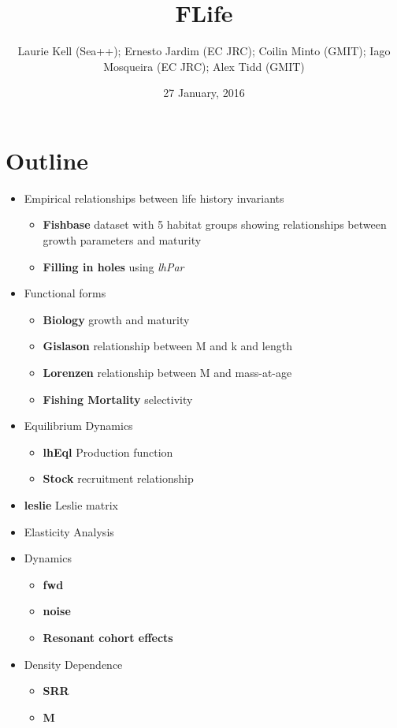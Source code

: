 \documentclass[]{article}
\title{FLife}
\author{Laurie Kell (Sea++); Ernesto Jardim (EC JRC); Coilin Minto (GMIT); Iago Mosqueira (EC JRC); Alex Tidd (GMIT)}
\date{27 January, 2016}
\begin{document}
\maketitle

\section*{Outline}

\begin{itemize}
\item Empirical relationships between life history invariants
\begin{itemize}
\item \textbf{Fishbase} dataset with 5 habitat groups showing relationships between growth parameters and maturity
\item \textbf{Filling in holes} using \textit{lhPar} 
\end{itemize}    
\item Functional forms 
\begin{itemize}
    \item \textbf{Biology} growth and maturity 
	\item \textbf{Gislason} relationship between M and k and length
	\item \textbf{Lorenzen} relationship between M and mass-at-age
	\item \textbf{Fishing Mortality} selectivity 
\end{itemize}    
\item Equilibrium Dynamics 
\begin{itemize}
	\item \textbf{lhEql} Production function   
	\item \textbf{Stock} recruitment relationship
\end{itemize}    
\item \textbf{leslie} Leslie matrix 
\item Elasticity Analysis 
\item Dynamics 
\begin{itemize}
   \item \textbf{fwd} 
   \item \textbf{noise}
   \item \textbf{Resonant cohort effects}
\end{itemize}    
\item Density Dependence 
\begin{itemize}
	\item \textbf{SRR}    
	\item \textbf{M}    

\end{itemize}
\end{itemize}
\end{document}
